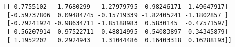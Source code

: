 \documentclass[11pt]{article}
\begin{document}
    \begin{Verbatim}[commandchars=\\\{\}]
[[ 0.7755102  -1.7680299  -1.27979795 -0.98246171 -1.49647917]
 [-0.59737806  0.09484745 -0.15719339 -1.82405241 -1.1802857 ]
 [-0.79241924 -0.98634711 -1.85188983  0.5830145  -0.47571597]
 [-0.56207914 -0.97522711 -0.48814995 -0.54083897  0.34345879]
 [ 1.1952202   0.2924943   1.31044486  0.16403318  0.16288193]]

    \end{Verbatim}

    \begin{center}
    \end{center}
    { \hspace*{\fill} \\}
    
    \begin{center}
    \end{center}
    { \hspace*{\fill} \\}
    
\end{document}
